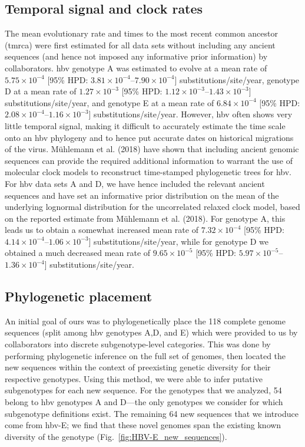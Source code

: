 \subsection{Temporal signal and clock rates}

The mean evolutionary rate and times to the most recent common ancestor (\gls{tmrca}) were first estimated for all data sets without including any ancient sequences (and hence not imposed any informative prior information) by collaborators.
\gls{hbv} genotype A was estimated to evolve at a mean rate of $5.75\times10^{-4}$ [95\% HPD: $3.81\times10^{-4}$--$7.90\times10^{-4}$] substitutions/site/year, genotype D at a mean rate of $1.27\times10^{-3}$ [95\% HPD: $1.12\times10^{-3}$--$1.43\times10^{-3}$] substitutions/site/year, and genotype E at a mean rate of $6.84\times10^{-4}$ [95\% HPD: $2.08\times10^{-4}$--$1.16\times10^{-3}$] substitutions/site/year.
However, \gls{hbv} often shows very little temporal signal, making it difficult to accurately estimate the time scale onto an \gls{hbv} phylogeny and to hence put accurate dates on historical migrations of the virus.
M{\"u}hlemann et al. (2018) have shown that including ancient genomic sequences can provide the required additional information to warrant the use of molecular clock models to reconstruct time-stamped phylogenetic trees for \gls{hbv}.
For \gls{hbv} data sets A and D, we have hence included the relevant ancient sequences and have set an informative prior distribution on the mean of the underlying lognormal distribution for the uncorrelated relaxed clock model, based on the reported estimate from M{\"u}hlemann et al. (2018).
For genotype A, this leads us to obtain a somewhat increased mean rate of $7.32\times10^{-4}$ [95\% HPD: $4.14\times10^{-4}$--$1.06\times10^{-3}$] substitutions/site/year, while for genotype D we obtained a much decreased mean rate of $9.65\times10^{-5}$ [95\% HPD: $5.97\times10^{-5}$--$1.36\times10^{-4}$] substitutions/site/year.

\subsection{Phylogenetic placement}

An initial goal of ours was to phylogenetically place the 118 complete genome sequences (split among \gls{hbv} genotypes A,D, and E) which were provided to us by collaborators into discrete subgenotype-level categories.
This was done by performing phylogenetic inference on the full set of genomes, then located the new sequences within the context of preexisting genetic diversity for their respective genotypes.
Using this method, we were able to infer putative subgenotypes for each new sequence.
For the genotypes that we analyzed, 54 belong to \gls{hbv} genotypes A and D---the only genotypes we consider for which subgenotype definitions exist.
The remaining 64 new sequences that we introduce come from \gls{hbv}-E; we find that these novel genomes span the existing known diversity of the genotype (Fig.~\ref{fig:HBV-E_new_sequences}).

